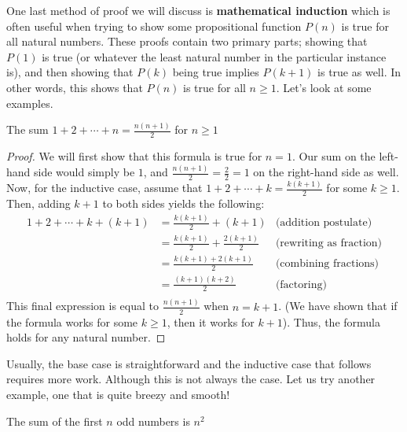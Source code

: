 One last method of proof we will discuss is \textbf{mathematical induction} which is often useful when trying to show some propositional function $P(n)$ is true for all natural numbers. These proofs contain two primary parts; showing that $P(1)$ is true (or whatever the least natural number in the particular instance is), and then showing that $P(k)$ being true implies $P(k+1)$ is true as well. In other words, this shows that $P(n)$ is true for all $n\geq 1$. Let's look at some examples. 

\begin{theorem}
    The sum $1+2+\cdots +n=\frac{n(n+1)}{2}$ for $n\geq 1$
\end{theorem}

\begin{proof}
    We will first show that this formula is true for $n=1$. Our sum on the left-hand side would simply be $1$, and $\frac{n(n+1)}{2}=\frac{2}{2}=1$ on the right-hand side as well. Now, for the inductive case, assume that $1+2+\cdots +k=\frac{k(k+1)}{2}$ for some $k\geq 1$. Then, adding $k+1$ to both sides yields the following:
    \begin{align*}
       1+2+\cdots +k+(k+1)&=\frac{k(k+1)}{2}+(k+1) &\text{(addition postulate)} \\
         &=\frac{k(k+1)}{2} +\frac{2(k+1)}{2} &\text{(rewriting as fraction)}\\
         &=\frac{k(k+1)+2(k+1)}{2}  &\text{(combining fractions)}\\
         &=\frac{(k+1)(k+2)}{2}  &\text{(factoring)}\\
    \end{align*}
    This final expression is equal to $\frac{n(n+1)}{2}$ when $n=k+1$. (We have shown that if the formula works for some $k\geq 1$, then it works for $k+1$). Thus, the formula holds for any natural number. 
\end{proof}

Usually, the base case is straightforward and the inductive case that follows requires more work. Although this is not always the case. Let us try another example, one that is quite breezy and smooth!

\begin{theorem}
    The sum of the first $n$ odd numbers is $n^2$
\end{theorem}


